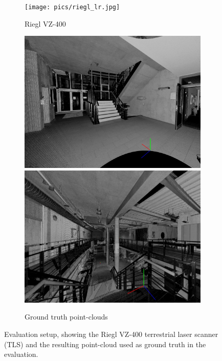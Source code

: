 \documentclass[english, bachelor, utf8]{base/thesis_telematics}
\begin{document}
\begin{figure}[t]
\centering
\begin{subfigure}{0.495\columnwidth}
        \centering
        \texttt{[image: pics/riegl\_lr.jpg]}
        \caption{Riegl VZ-400}
        \label{fig:riegl}
\end{subfigure}
\hfill
\begin{subfigure}{0.49\columnwidth}
        \centering
        \includegraphics[width=\textwidth]{pics/groundtruth1.jpg}\vspace{.5mm}
        \includegraphics[width=\textwidth]{pics/groundtruth2.jpg}
        \caption{Ground truth point-clouds}
        \label{fig:sphere_on_the_move}
\end{subfigure}
\caption{Evaluation setup, showing the Riegl VZ-400 terrestrial laser scanner (TLS) and the resulting point-cloud used as ground truth in the evaluation.}\vspace{-3mm}
\end{figure}
\end{document}
